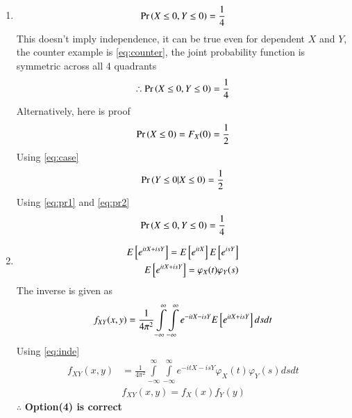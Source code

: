 \documentclass[journal,12pt,twocolumn]{IEEEtran}
\begin{document}
\begin{enumerate}
\begin{figure}[H]
\label{plot}
\end{figure}
\item
\begin{align}
\Pr\left(X\le 0, Y\le0\right)=\frac{1}{4}
\end{align}
This doesn't imply independence, it can be true even for dependent $X$ and $Y$, the counter example is \eqref{eq:counter}, the joint probability function is symmetric across all 4 quadrants
\begin{align}
\therefore \Pr\left(X\le 0, Y\le0\right)=\frac{1}{4}
\end{align}
Alternatively, here is proof 
\begin{align}
\Pr\left(X\le 0\right)=F_X(0)=\frac{1}{2} \label{eq:pr1}
\end{align}
Using \eqref{eq:case}
\begin{align}
\Pr\left(Y\le 0|X\le 0\right)=\frac{1}{2} \label{eq:pr2}
\end{align}
Using \eqref{eq:pr1} and \eqref{eq:pr2}
\begin{align}
\Pr\left(X\le 0, Y\le0\right)=\frac{1}{4}
\end{align}
\item
\begin{align}
E{}\left[e^{itX+isY}\right]=E{}\left[e^{itX}\right]E{}\left[e^{isY}\right]\\
E{}\left[e^{itX+isY}\right]=\varphi_X(t)\varphi_Y(s) \label{eq:inde}
\end{align}
The inverse is given as
\begin{align}
f_{XY}(x,y)=\frac{1}{4\pi^2}\displaystyle \int\limits_{-\infty}^{\infty} \int\limits_{-\infty}^{\infty} e^{-itX-isY}E{}\left[e^{itX+isY}\right]ds dt
\end{align}
Using \eqref{eq:inde}
\begin{align}
f_{XY}(x,y)&=\frac{1}{4\pi^2}\displaystyle \int\limits_{-\infty}^{\infty} \int\limits_{-\infty}^{\infty} e^{-itX-isY}\varphi_X(t)\varphi_Y(s) ds dt\\
&f_{XY}(x,y)=f_X(x)f_Y(y)
\end{align}
$\therefore$ \textbf{Option(4) is correct}
\end{enumerate}
\end{document}
